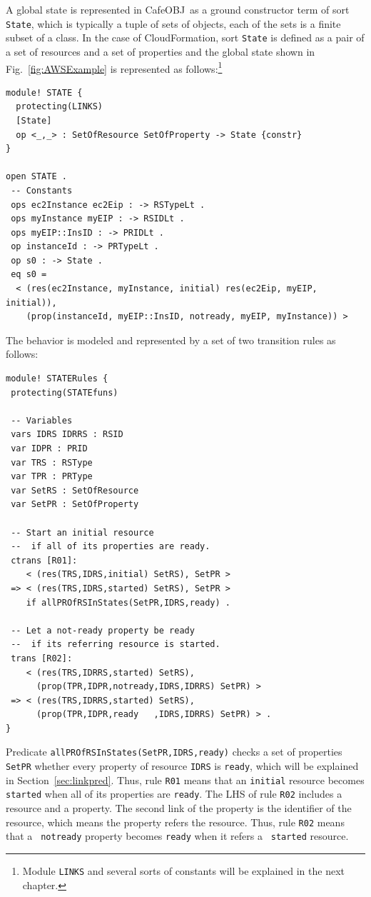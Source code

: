 \documentclass[12pt]{report}
\newcommand{\stt}[1]{{\small{\tt {#1}}}}
\newcommand{\cafeobj}{{\sf CafeOBJ}~}
\begin{document}
A global state is represented in \cafeobj as a ground constructor term
of sort {\tt State}, which is typically a tuple of sets of objects,
each of the sets is a finite subset of a class.  In the case of
CloudFormation, sort {\tt State} is defined as a pair of a set of
resources and a set of properties and the global state shown in
Fig.~\ref{fig:AWSExample} is represented as follows:\footnote{Module
  {\tt LINKS} and several sorts of constants will be explained in the
  next chapter.}
\begin{verbatim}
module! STATE {
  protecting(LINKS)
  [State]
  op <_,_> : SetOfResource SetOfProperty -> State {constr}
}

open STATE . 
 -- Constants
 ops ec2Instance ec2Eip : -> RSTypeLt .
 ops myInstance myEIP : -> RSIDLt .
 ops myEIP::InsID : -> PRIDLt .
 op instanceId : -> PRTypeLt .
 op s0 : -> State .
 eq s0 =
  < (res(ec2Instance, myInstance, initial) res(ec2Eip, myEIP, initial)),
    (prop(instanceId, myEIP::InsID, notready, myEIP, myInstance)) >
\end{verbatim}
The behavior is modeled and represented by a set of two transition
rules as follows:
\begin{verbatim}
module! STATERules {
 protecting(STATEfuns)

 -- Variables
 vars IDRS IDRRS : RSID 
 var IDPR : PRID
 var TRS : RSType
 var TPR : PRType
 var SetRS : SetOfResource
 var SetPR : SetOfProperty

 -- Start an initial resource
 --  if all of its properties are ready.
 ctrans [R01]:
    < (res(TRS,IDRS,initial) SetRS), SetPR >
 => < (res(TRS,IDRS,started) SetRS), SetPR > 
    if allPROfRSInStates(SetPR,IDRS,ready) .

 -- Let a not-ready property be ready 
 --  if its referring resource is started.
 trans [R02]:
    < (res(TRS,IDRRS,started) SetRS), 
      (prop(TPR,IDPR,notready,IDRS,IDRRS) SetPR) >
 => < (res(TRS,IDRRS,started) SetRS), 
      (prop(TPR,IDPR,ready   ,IDRS,IDRRS) SetPR) > .
}
\end{verbatim}
Predicate \stt{allPROfRSInStates(SetPR,IDRS,ready)} checks a set of
properties {\tt SetPR} whether every property of resource {\tt IDRS}
is {\tt ready}, which will be explained in Section~\ref{sec:linkpred}.
Thus, rule {\tt R01} means that an {\tt initial} resource becomes {\tt
  started} when all of its properties are {\tt ready}.  The LHS of
rule {\tt R02} includes a resource and a property.  The second link of
the property is the identifier of the resource, which means the
property refers the resource.  Thus, rule {\tt R02} means that a {\tt
  notready} property becomes {\tt ready} when it refers a {\tt
  started} resource.
\end{document}

